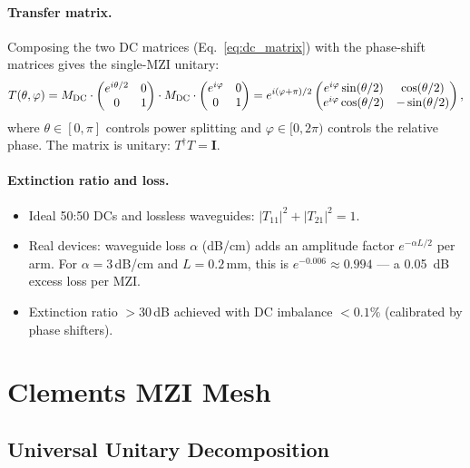 \documentclass[12pt, a4paper]{article}
\begin{document}
\paragraph{Transfer matrix.}
Composing the two DC matrices (Eq.~\eqref{eq:dc_matrix}) with the
phase-shift matrices gives the single-MZI unitary:
\begin{equation}
  T(\theta, \varphi) = M_{\rm DC} \cdot
  \begin{pmatrix} e^{i\theta/2} & 0 \\ 0 & 1 \end{pmatrix}
  \cdot M_{\rm DC} \cdot
  \begin{pmatrix} e^{i\varphi} & 0 \\ 0 & 1 \end{pmatrix}
  =
  e^{i(\varphi+\pi)/2}
  \begin{pmatrix}
    e^{i\varphi}\sin(\theta/2) &  \cos(\theta/2) \\
    e^{i\varphi}\cos(\theta/2) & -\sin(\theta/2)
  \end{pmatrix},
  \label{eq:mzi_T}
\end{equation}
where $\theta \in [0, \pi]$ controls power splitting and
$\varphi \in [0, 2\pi)$ controls the relative phase.
The matrix is unitary: $T^\dagger T = \mathbf{I}$.

\paragraph{Extinction ratio and loss.}
\begin{itemize}
  \item Ideal 50:50 DCs and lossless waveguides: $|T_{11}|^2 + |T_{21}|^2 = 1$.
  \item Real devices: waveguide loss $\alpha$ (dB/cm) adds an amplitude factor
    $e^{-\alpha L/2}$ per arm. For $\alpha = 3$\,dB/cm and $L = 0.2$\,mm,
    this is $e^{-0.006} \approx 0.994$ --- a \SI{0.05}{\dB} excess loss per MZI.
  \item Extinction ratio $> 30$\,dB achieved with DC imbalance $< 0.1\%$
    (calibrated by phase shifters).
\end{itemize}

\section{Clements MZI Mesh}
\label{sec:clements}

\subsection{Universal Unitary Decomposition}
\end{document}
